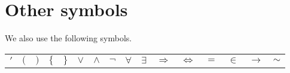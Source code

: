 \section*{Other symbols}

We also use the following symbols.
\begin{center}
\vspace{0.3cm}
\begin{tabular}{cccccccccccccccc}
$'$ & $($ & $)$ & $\{$ & $\}$ & $\lor$ & $\land$ & $\neg$ & $\forall$ & $\exists $ & $\Rightarrow$ & $\iff$ & $=$ & $\in$ & $\to$ & $\sim$\\
\end{tabular}
\vspace{0.1cm}

%   
\end{center}
